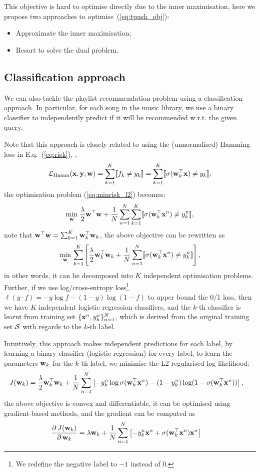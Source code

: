 This objective is hard to optimise directly due to the inner maximisation,
here we propose two approaches to optimise~(\ref{eq:tpush_obj}):
\begin{itemize}
\item Approximate the inner maximisation;
\item Resort to solve the dual problem.
\end{itemize}



\subsection{Classification approach}
\label{ssec:classify}

We can also tackle the playlist recommendation problem using a classification approach.
In particular, for each song in the music library, 
we use a binary classifier to independently predict if it will be recommended w.r.t. the given query.

Note that this approach is closely related to using the (unnormalised) Hamming loss in E.q.~(\ref{eq:risk}), \ie,
$$
\mathcal{L}_\text{Hamm}(\mathbf{x}, \mathbf{y}; \mathbf{w}) = \sum_{k=1}^K \llbracket f_k \neq y_k \rrbracket = \sum_{k=1}^K \llbracket \sigma(\mathbf{w}_k^\top \mathbf{x}) \neq y_k \rrbracket,
$$
the optimisation problem (\ref{eq:minrisk_l2}) becomes:
$$
\min_{\mathbf{w}} \, \frac{\lambda}{2} \mathbf{w}^\top \mathbf{w} + \frac{1}{N} \sum_{n=1}^N \sum_{k=1}^K \llbracket \sigma(\mathbf{w}_k^\top \mathbf{x}^n) \neq y_k^n \rrbracket,
$$
note that $\mathbf{w}^\top \mathbf{w} = \sum_{k=1}^K \mathbf{w}_k^\top \mathbf{w}_k$, the above objective can be rewritten as
$$
\min_{\mathbf{w}} \, \sum_{k=1}^K \left[ \frac{\lambda}{2} \mathbf{w}_k^\top \mathbf{w}_k + \frac{1}{N} \sum_{n=1}^N \llbracket \sigma(\mathbf{w}_k^\top \mathbf{x}^n) \neq y_k^n \rrbracket \right],
$$
in other words, it can be decomposed into $K$ independent optimisation problems.
Further, if we use log/cross-entropy loss\footnote{We redefine the negative label to $-1$ instead of $0$.}
$\ell(y \cdot f) = -y\log f - (1-y)\log(1 - f)$ 
to upper bound the 0/1 loss, then we have $K$ independent logistic regression classifiers,
and the $k$-th classifier is learnt from training set $\{\mathbf{x}^n, y_k^n\}_{n=1}^N$, 
which is derived from the original training set $\mathcal{S}$ with regards to the $k$-th label.

Intuitively, this approach makes independent predictions for each label, by learning a binary classifier (\eg logistic regression) for every label,
\ie to learn the parameters $\mathbf{w}_k$ for the $k$-th label, we minimise the L2 regularised log likelihood:
\begin{align*}
J(\mathbf{w}_k) 
&= \frac{\lambda}{2} \mathbf{w}_k^\top \mathbf{w}_k + 
   \frac{1}{N} \sum_{n=1}^N \left[ -y_k^n \log \sigma(\mathbf{w}_k^\top \mathbf{x}^n) - (1 - y_k^n) \log (1 - \sigma(\mathbf{w}_k^\top \mathbf{x}^n)) \right],
\end{align*}
the above objective is convex and differentiable, it can be optimised using gradient-based methods, 
and the gradient can be computed as
\begin{align*}
\frac{\partial \, J(\mathbf{w}_k)} {\partial \, \mathbf{w}_k} 
&= \lambda \mathbf{w}_k + \frac{1}{N} \sum_{n=1}^N \left[ -y_k^n \mathbf{x}^n + \sigma(\mathbf{w}_k^\top \mathbf{x}^n) \mathbf{x}^n \right]
\end{align*}


